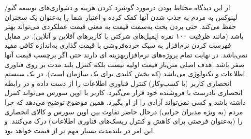 
از این دیدگاه محتاط بودن درمورد گوشزد کردن هزینه و دشواری‌های توسعه گنو/لینوکس
به مردم به جذب شدن آنها کمک کرده و اعتبار شما را به‌عنوان یک سخنران حفظ می‌کند.
حتی بردن بحث به‌سمت قیمت به معنی قیمت عملکردی می‌تواند بهتر باشد
(مانند ظرفیت ۱۰۰ نفره ایمیل‌های شرکتی با کاربر‌های آفلاین و آنلاین).
در مقابل فهرست کردن نرم‌افزار به سبک خرده‌فروشی با قیمت گذاری به‌اندازه کافی مفید نمی‌باشد.
در نهایت تمام پروژه‌های نرم‌افزاریهزینه ای دارند حتی اگر برچسب قیمت آنها صفر باشد.
هدف اصلی متن‌باز قیمت اولیه نیست بلکه کنترل بلند مدت بر روی فناوری اطلاعات و تکنولوژی می‌باشد
(که بخش کلیدی برای یک سازمان است). در یک سیستم انحصاری کاربر (یا کسب‌و‌کار) کنترل فناوری اطلاعات
را از دست داده و در رابطه انحصاری نادرست با فروشنده خود قرار می‌گیرد.
کاربر با اوپن سورس می‌تواند کنترل داشته باشد و کسی نمی‌تواند آزادی را از او بگیرد.
همین موضوع توضیح می‌دهد که چرا مردم (به ویژه مدیران جرایی) درحال حاضر تفاوت بین 
اوپن سورس و کالای انحصاری را (به‌عنوان فرصتی برای کاهش و کنترل ریسک‌های فناوری اطلاعات)
درک می‌کنند. و این امر در بلندمدت بسیار مهم تر از قیمت خواهد بود.

